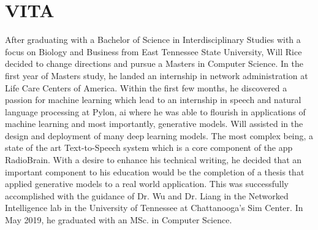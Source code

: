 \singlespacing
\chapter*{VITA}
\doublespacing
After graduating with a Bachelor of Science in Interdisciplinary Studies with a focus on Biology and Business from East Tennessee State University, Will Rice decided to change directions and pursue a Masters in Computer Science. In the first year of Masters study, he landed an internship in network administration at Life Care Centers of America. Within the first few months, he discovered a passion for machine learning which lead to an internship in speech and natural language processing at Pylon, ai where he was able to flourish in applications of machine learning and most importantly, generative models. Will assisted in the design and deployment of many deep learning models. The most complex being, a state of the art Text-to-Speech system which is a core component of the app RadioBrain. With a desire to enhance his technical writing, he decided that an important component to his education would be the completion of a thesis that applied generative models to a real world application. This was successfully accomplished with the guidance of Dr. Wu and Dr. Liang in the Networked Intelligence lab in the University of Tennessee at Chattanooga’s Sim Center. In May 2019, he graduated with an MSc. in Computer Science.